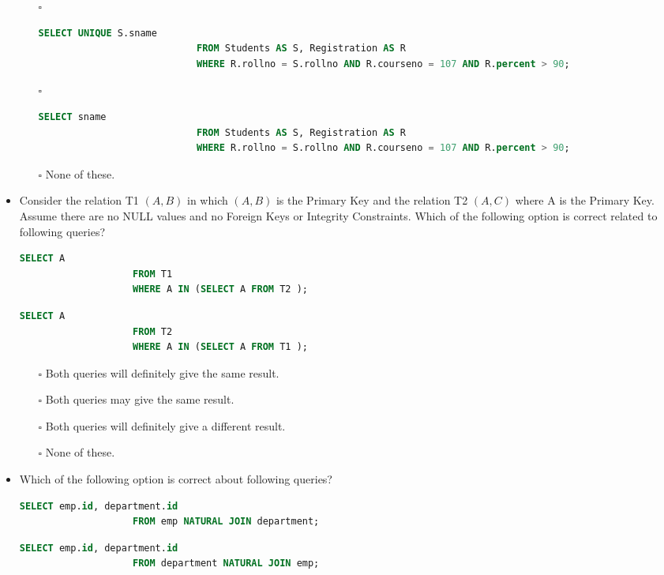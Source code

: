 \documentclass[10pt]{article}
\begin{document}
\begin{itemize}
\begin{enumerate}
					\item[$\square$] 
						\begin{lstlisting}[language=SQL,firstline=1, lastline=3, numbers = right] 
							SELECT UNIQUE S.sname 
							FROM Students AS S, Registration AS R 
							WHERE R.rollno = S.rollno AND R.courseno = 107 AND R.percent > 90;
						\end{lstlisting}
					
					\item[$\square$] 
						\begin{lstlisting}[language=SQL,firstline=1, lastline=3, numbers = right] 
							SELECT sname 
							FROM Students AS S, Registration AS R 
							WHERE R.rollno = S.rollno AND R.courseno = 107 AND R.percent > 90;
						\end{lstlisting}
					
					\item[$\square$] None of these.
				\end{enumerate}

			\item Consider the relation T1 $(A,B)$ in which $(A,B)$ is the Primary Key and the relation T2 $(A,C)$ where A is the Primary Key. Assume there are no NULL values and no Foreign Keys or Integrity Constraints. Which of the following option is correct related to following queries?
				\begin{lstlisting}[language=SQL,firstline=1, lastline=3] 
					SELECT A 
					FROM T1 
					WHERE A IN (SELECT A FROM T2 );
				\end{lstlisting}
				\begin{lstlisting}[language=SQL,firstline=1, lastline=3] 
					SELECT A 
					FROM T2 
					WHERE A IN (SELECT A FROM T1 );
				\end{lstlisting}

				\begin{enumerate}
					\item[$\square$] Both queries will definitely give the same result.
					\item[$\square$] Both queries may give the same result.
					\item[$\square$] Both queries will definitely give a different result.
					\item[$\square$] None of these.
				\end{enumerate}

			\item Which of the following option is correct about following queries?
				\begin{lstlisting}[language=SQL,firstline=1, lastline=2] 
					SELECT emp.id, department.id 
					FROM emp NATURAL JOIN department;
				\end{lstlisting}
				\begin{lstlisting}[language=SQL,firstline=1, lastline=2] 
					SELECT emp.id, department.id 
					FROM department NATURAL JOIN emp;
				\end{lstlisting}


\end{itemize}
\end{document}
